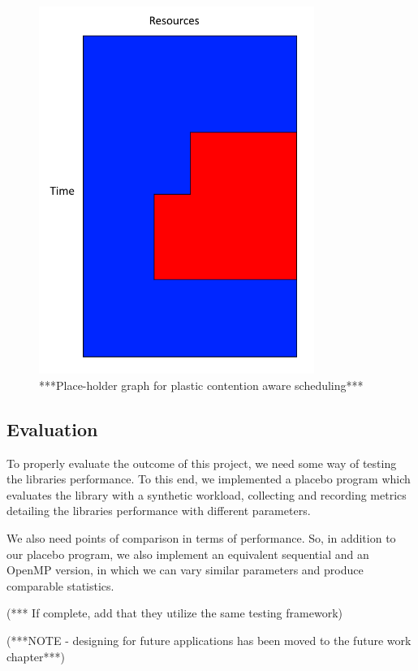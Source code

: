 \begin{figure}
	\includegraphics[width=0.8\textwidth]{graphics/placeholder_plastic_contention_aware_scheduling.png}
	\caption{***Place-holder graph for plastic contention aware scheduling***}
	\label{fig:plastic_contention_aware_scheduling}
\end{figure}



\subsection{Evaluation}

To properly evaluate the outcome of this project, we need some way of testing the libraries performance. To this end, we implemented a placebo program which evaluates the library with a synthetic workload, collecting and recording metrics detailing the libraries performance with different parameters.  

We also need points of comparison in terms of performance. So, in addition to our placebo program, we also implement an equivalent sequential and an OpenMP version, in which we can vary similar parameters and produce comparable statistics. 

(*** If complete, add that they utilize the same testing framework)

(***NOTE - designing for future applications has been moved to the future work chapter***)
